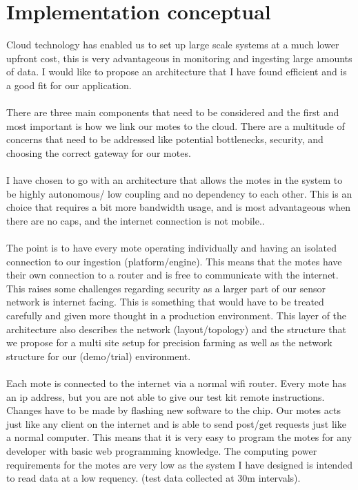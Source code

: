 \documentclass[]{uiophd}
\begin{document}
\section{Implementation conceptual}
Cloud technology has enabled us to set up large scale systems at a much lower upfront cost, this is very advantageous in monitoring and ingesting large amounts of data. I would like to propose an architecture that I have found efficient and is a good fit for our application. 
\\\\
There are three main components that need to be considered and the first and most important is how we link our motes to the cloud. There are a multitude of concerns that need to be addressed like potential bottlenecks, security, and choosing the correct gateway for our motes.
\\\\
I have chosen to go with an architecture that allows the motes in the system to be highly autonomous/ low coupling and no dependency to each other. This is an choice that requires a bit more bandwidth usage, and is most advantageous when there are no caps, and the internet connection is not mobile..
\\\\
The point is to have every mote operating individually and having an isolated connection to our ingestion (platform/engine). This means that the motes have their own connection to a router and is free to communicate with the internet. This raises some challenges regarding security as a larger part of our sensor network is internet facing. This is something that would have to be treated carefully and given more thought in a production environment. This layer of the architecture also describes the network (layout/topology) and the structure that we propose for a multi site setup for precision farming as well as the network structure for our (demo/trial) environment.
\\\\
Each mote is connected to the internet via a normal wifi router. Every mote has an ip address, but you are not able to give our test kit remote instructions. Changes have to be made by flashing new software to the chip. Our motes acts just like any client on the internet and is able to send post/get requests just like a normal computer. This means that it is very easy to program the motes for any developer with basic web programming knowledge. The computing power requirements for the motes are very low as the system I have designed is intended to read data at a low requency. (test data collected at 30m intervals).
\end{document}
